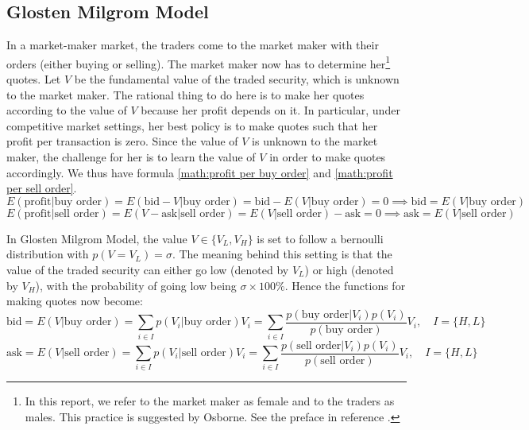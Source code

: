 \documentclass{article}
\begin{document}
\subsection{Glosten Milgrom Model}\label{GM Model}
In a market-maker market, the traders come to the market maker with their orders (either buying or selling). The market maker now has to determine her\footnote{In this report, we refer to the market maker as female and to the traders as males. This practice is suggested by Osborne. See the preface in reference \cite{gametheory:1994}.} quotes. Let $V$ be the fundamental value of the traded security, which is unknown to the market maker. The rational thing to do here is to make her quotes according to the value of $V$ because her profit depends on it. In particular, under competitive market settings, her best policy is to make quotes such that her profit per transaction is zero. Since the value of $V$ is unknown to the market maker, the challenge for her is to learn the value of $V$ in order to make quotes accordingly. We thus have formula \ref{math:profit per buy order} and \ref{math:profit per sell order}.
\begin{equation}
    E(\text{profit}|\text{buy order}) = E(\text{bid} - V|\text{buy order}) = \text{bid} - E(V|\text{buy order}) = 0
    \implies \text{bid} = E(V|\text{buy order})
    \label{math:profit per buy order}
\end{equation}
\begin{equation}
    E(\text{profit}|\text{sell order}) = E(V - \text{ask}|\text{sell order}) = E(V|\text{sell order}) - \text{ask} = 0
    \implies \text{ask} = E(V|\text{sell order})
    \label{math:profit per sell order}
\end{equation}

In Glosten Milgrom Model, the value $V \in \{V_L, V_H\}$ is set to follow a bernoulli distribution with $p(V = V_L) = \sigma$. The meaning behind this setting is that the value of the traded security can either go low (denoted by $V_L$) or high (denoted by $V_H$), with the probability of going low being $\sigma \times 100\%$. Hence the functions for making quotes now become\footnotemark{}:
\begin{equation}
    \text{bid} = E(V|\text{buy order}) = \sum_{i \in I}{p(V_i|\text{buy order})V_i} = \sum_{i \in I}{\frac{p(\text{buy order}|V_i)p(V_i)}{p(\text{buy order})}V_i}, \quad I = \{H, L\}
\end{equation}
\begin{equation}
    \text{ask} = E(V|\text{sell order}) = \sum_{i \in I}{p(V_i|\text{sell order})V_i} = \sum_{i \in I}{\frac{p(\text{sell order}|V_i)p(V_i)}{p(\text{sell order})}V_i}, \quad I = \{H, L\}
\end{equation}
\end{document}
